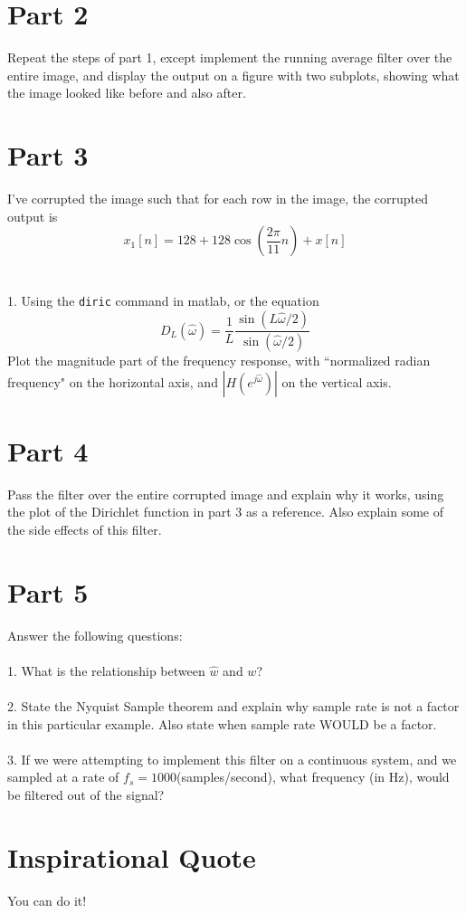 \documentclass[10pt,a4paper]{article}
\begin{document}
\section*{Part 2}
Repeat the steps of part 1, except implement the running average filter over the entire image, and display the output on a figure with two subplots, showing what the image looked like before and also after.  

\section*{Part 3}
I've corrupted the image such that for each row in the image, the corrupted output is
\begin{equation}
x_{1}[n] = 128 + 128\cos(\frac{2 \pi}{11}n) + x[n]
\end{equation}
\\ \\
1.  Using the \texttt{diric} command in matlab, or the equation
\begin{equation*}
D_{L}(\hat{\omega}) = \frac{1}{L}\frac{\sin(L \hat{\omega}/2)}{\sin(\hat{\omega}/2)}
\end{equation*}
Plot the magnitude part of the frequency response, with ``normalized radian frequency" on the horizontal axis, and $|H(e^{j \hat{\omega}})|$ on the vertical axis.

\section*{Part 4}
Pass the filter over the entire corrupted image and explain why it works, using the plot of the Dirichlet function in part 3 as a reference. Also explain some of the side effects of this filter.  

\section*{Part 5}
Answer the following questions:
\\ \\
1.  What is the relationship between $\hat{w}$ and $w$?
\\ \\
2.  State the Nyquist Sample theorem and explain why sample rate is not a factor in this particular example. Also state when sample rate WOULD be a factor.
\\ \\
3.  If we were attempting to implement this filter on a continuous system, and we sampled at a rate of $f_{s} = 1000$(samples/second), what frequency (in Hz), would be filtered out of the signal?

\section*{Inspirational Quote}
You can do it!
\end{document}

